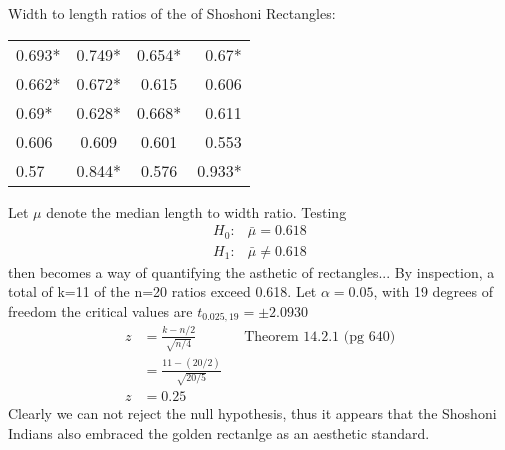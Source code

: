 \documentclass[12pt]{article}
\newenvironment{problem}[2][Problem]{\begin{trivlist}
\item[\hskip \labelsep {\bfseries #1}\hskip \labelsep {\bfseries #2.}]}{\end{trivlist}}
\begin{document}
\newpage
\begin{problem}{14.2.6} Width to length ratios of the of Shoshoni Rectangles:

\begin{table}[h!]
\centering
\begin{tabular}{lccr}
\hline
0.693*  &   0.749*  &	0.654*  & 	0.67*  \\
0.662*  &   0.672*  &	0.615  & 	0.606 \\
0.69*    &     0.628* &	0.668*  & 	0.611 \\
0.606    &   0.609  &	0.601  & 	0.553 \\
0.57      &    0.844*  &	0.576  & 	0.933* \\
\hline
\end{tabular}
\end{table}

Let $\mu $ denote the median length to width ratio. Testing 
\begin{align*}
H_0: & \bar{\mu } = 0.618 \\
H_1: & \bar{\mu } \neq 0.618
\end{align*}
then becomes a way of quantifying the asthetic of rectangles... By inspection, a total of k=11 of the n=20 ratios exceed 0.618. Let $\alpha = 0.05$, with 19 degrees of freedom the critical values are $t_{0.025,19}= \pm 2.0930 $
\begin{align*}
z &= \frac{k-n/2}{\sqrt{n/4}} && \text{Theorem 14.2.1 (pg 640)} \\
&= \frac{11-(20/2)}{\sqrt{20/5}} \\
z &= 0.25 
\end{align*}
Clearly we can not reject the null hypothesis, thus it appears that the Shoshoni Indians also embraced the golden rectanlge as an aesthetic standard. 

\end{problem}


\end{document}
